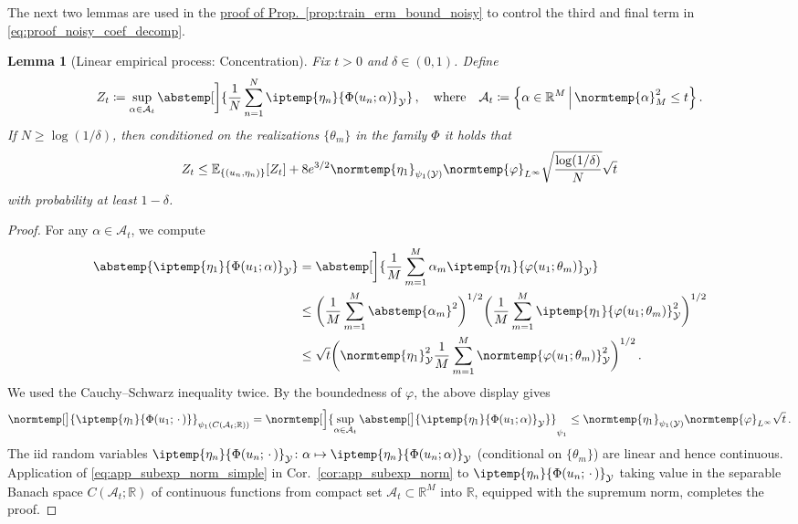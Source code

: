 \documentclass{article}
\theoremstyle{plain}
\newtheorem{lemma}[theorem]{Lemma}
\theoremstyle{my_def}
\theoremstyle{my_rem}
\numberwithin{equation}{section}
\numberwithin{theorem}{section}%
\newcommand{\R}{\mathbb{R}}
\newcommand{\E}{\mathbb{E}}
\newcommand{\cA}{\mathcal{A}}
\newcommand{\cY}{\mathcal{Y}}
\let\originalleft\left %
\let\originalright\right
\renewcommand{\left}{\mathopen{}\mathclose\bgroup\originalleft}
\renewcommand{\right}{\aftergroup\egroup\originalright}
\newcommand{\ip}{\iptemp}
\newcommand{\norm}{\normtemp}
\newcommand{\abs}{\abstemp}
\newcommand{\set}[2]{{\left\{ #1 \,\middle|\, #2 \right\}}}
\newcommand{\slot}{{\,\cdot\,}}
\newcommand{\defeq}{\coloneqq} %
\renewcommand{\E}{\operatorname{\mathbb{E}}} %
\def\qw{\quad\text{where}\quad}
\newcommand{\Th}{{\{\theta_m\}}}
\renewcommand{\phi}{\varphi}
\begin{document}
The next two lemmas are used in the \hyperref[proof:app_proof_emp]{proof of Prop.~\ref*{prop:train_erm_bound_noisy}} to control the third and final term in \eqref{eq:proof_noisy_coef_decomp}.
\begin{lemma}[Linear empirical process: Concentration]\label{lem:app_noise_sup_con}
    Fix $t>0$ and $\delta\in(0,1)$. Define
    \begin{equation}
        Z_t\defeq \sup_{\alpha\in\cA_t}\abs[\bigg]{\frac{1}{N}\sum_{n=1}^N\ip{\eta_n}{\Phi(u_n;\alpha)}_{\cY}}\,,\qw \cA_t\defeq \set{\alpha\in\R^M}{\norm{\alpha}_M^2\leq t}\,.
    \end{equation}
    If $N\geq\log(1/\delta)$, then conditioned on the realizations $\Th$ in the family $\Phi$ it holds that
    \begin{equation}
        Z_t\leq \E_{\{(u_n,\eta_n)\}} [Z_t] + 8e^{3/2}\norm{\eta_1}_{\psi_1(\cY)}\norm{\phi}_{L^\infty}\sqrt{\frac{\log(1/\delta)}{N}}\sqrt{t}
    \end{equation}
    with probability at least $1-\delta$.
\end{lemma}
\begin{proof}
    For any $\alpha\in\cA_t$, we compute
    \begin{align*}
        \abs{\ip{\eta_1}{\Phi(u_1;\alpha)}_{\cY}}&=\abs[\bigg]{\frac{1}{M}\sum_{m=1}^M\alpha_m\ip{\eta_1}{\phi(u_1;\theta_m)}_{\cY}}\\
        &\leq \biggl(\frac{1}{M}\sum_{m=1}^M\abs{\alpha_m}^2\biggr)^{1/2}\biggl(\frac{1}{M}\sum_{m=1}^M\ip{\eta_1}{\phi(u_1;\theta_m)}^2_{\cY}\biggr)^{1/2}\\
        &\leq \sqrt{t}\biggl(\norm{\eta_1}_{\cY}^2\frac{1}{M}\sum_{m=1}^M\norm{\phi(u_1;\theta_m)}^2_{\cY}\biggr)^{1/2}\, .
    \end{align*}
    We used the Cauchy--Schwarz inequality twice. By the boundedness of $\phi$, the above display gives
    \begin{equation*}
            \norm[\big]{\ip{\eta_1}{\Phi(u_1;\slot)}}_{\psi_1(C(\cA_t;\R))}=\norm[\Big]{\sup_{\alpha\in\cA_t}\abs[\big]{\ip{\eta_1}{\Phi(u_1;\alpha)}_{\cY}}}_{\psi_1}\leq \norm{\eta_1}_{\psi_1(\cY)}\norm{\phi}_{L^\infty}\sqrt{t}\, .
    \end{equation*}
    The iid random variables $\ip{\eta_n}{\Phi(u_n;\slot)}_{\cY}\colon \alpha\mapsto \ip{\eta_n}{\Phi(u_n;\alpha)}_{\cY}$ (conditional on $\Th$) are linear and hence continuous. Application of \eqref{eq:app_subexp_norm_simple} in Cor.~\ref{cor:app_subexp_norm} to $\ip{\eta_n}{\Phi(u_n;\slot)}_{\cY}$ taking value in the separable Banach space $C(\cA_t;\R)$ of continuous functions from compact set $\cA_t\subset\R^M$ into $\R$, equipped with the supremum norm, completes the proof.
\end{proof}
\end{document}
